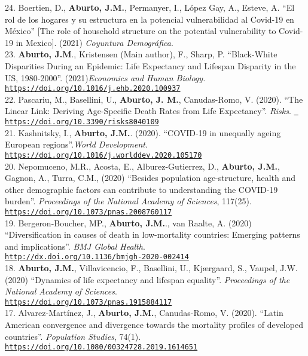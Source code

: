 \documentclass[12pt]{article}
\providecommand*\url[1]{\href{#1}{#1}}
\renewcommand*\url[1]{\href{#1}{\texttt{#1}}}
\begin{document}
24. Boertien, D., \textbf{Aburto, J.M.},  Permanyer, I., López Gay, A., Esteve, A. ``El rol de los hogares y su estructura en la potencial vulnerabilidad al Covid-19 en México'' [The role of household structure on the potential vulnerability to Covid-19 in Mexico]. (2021) \textit{Coyuntura Demogr\'afica}. \\

23. \textbf{Aburto, J.M}., Kristensen (Main author), F., Sharp, P. ``Black-White Disparities During an Epidemic: Life Expectancy and Lifespan Disparity in the US, 1980-2000''. (2021)\textit{Economics and Human Biology.} \url{https://doi.org/10.1016/j.ehb.2020.100937}\\

22. Pascariu, M., Basellini, U., \textbf{Aburto, J. M.}, Canudas-Romo, V. (2020). ``The Linear Link: Deriving Age-Specific Death Rates from Life Expectancy''.  \textit{Risks}. \url{ https://doi.org/10.3390/risks8040109}\\

21. Kashnitsky, I., \textbf{Aburto, J.M.}. (2020). ``COVID-19 in unequally ageing European regions''.\textit{World Development}. \\
\url{https://doi.org/10.1016/j.worlddev.2020.105170} \\

20. Nepomuceno, M.R.,  Acosta, E., Alburez-Gutierrez, D., \textbf{Aburto, J.M.},  Gagnon, A.,  Turra, C.M., (2020) ``Besides population age-structure, health and other demographic factors can contribute to understanding the COVID-19 burden''.  \textit{Proceedings of the National Academy of Sciences}, 117(25). \url{https://doi.org/10.1073/pnas.2008760117} \\

19. Bergeron-Boucher, MP., \textbf{Aburto, J.M.}., van Raalte, A. (2020) ``Diversification in causes of death in low-mortality countries:  Emerging patterns and implications''. \textit{BMJ Global Health}.\\ \url{http://dx.doi.org/10.1136/bmjgh-2020-002414} \\

18. \textbf{Aburto, J.M.},  Villavicencio, F., Basellini, U., Kj{\ae}rgaard, S., Vaupel, J.W. (2020) ``Dynamics of life expectancy and lifespan equality''.  \textit{Proceedings of the National Academy of Sciences}.\\ \url{https://doi.org/10.1073/pnas.1915884117} \\

17. Alvarez-Mart\'inez, J., \textbf{Aburto, J.M.}, Canudas-Romo, V. (2020). ``Latin American convergence and divergence towards the mortality profiles of developed countries''. \textit{Population Studies}, 74(1).\\ \url{https://doi.org/10.1080/00324728.2019.1614651} \\
\end{document}
